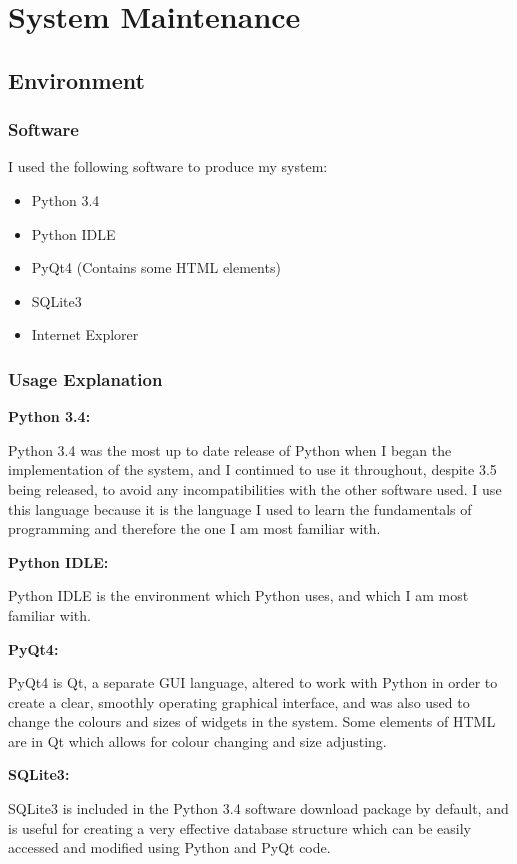 \chapter{System Maintenance}

\section{Environment}

\subsection{Software}

I used the following software to produce my system:

\begin{itemize}
	\item Python 3.4
	\item Python IDLE
	\item PyQt4 (Contains some HTML elements)
	\item SQLite3
	\item Internet Explorer
\end{itemize}

\subsection{Usage Explanation}

\textbf{Python 3.4: }

Python 3.4 was the most up to date release of Python when I began the implementation of the system, and I continued to use it throughout, despite 3.5 being released, to avoid any incompatibilities with the other software used. I use this language because it is the language I used to learn the fundamentals of programming and therefore the one I am most familiar with. 

\textbf{Python IDLE: }

Python IDLE is the environment which Python uses, and which I am most familiar with.

\textbf{PyQt4: }

PyQt4 is Qt, a separate GUI language, altered to work with Python in order to create a clear, smoothly operating graphical interface, and was also used to change the colours and sizes of widgets in the system. Some elements of HTML are in Qt which allows for colour changing and size adjusting.

\textbf{SQLite3: }

SQLite3 is included in the Python 3.4 software download package by default, and is useful for creating a very effective database structure which can be easily accessed and modified using Python and PyQt code. 

